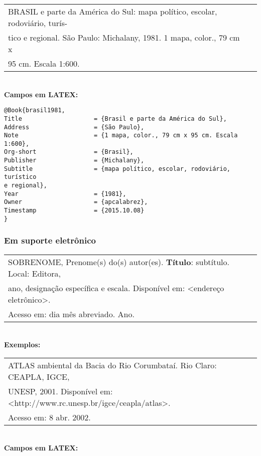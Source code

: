 \begin{tabular}{|l|c|} \hline
BRASIL e parte da América do Sul: mapa político, escolar, rodoviário,
turís-\\ 
tico e regional. São Paulo: Michalany, 1981. 1 mapa, color., 79 cm x\\
95 cm. Escala 1:600. 
	\\\hline
\end{tabular} \\

\textbf{Campos em LATEX:} 

\begin{verbatim}
@Book{brasil1981,
Title                    = {Brasil e parte da América do Sul},
Address                  = {São Paulo},
Note                     = {1 mapa, color., 79 cm x 95 cm. Escala 1:600},
Org-short                = {Brasil},
Publisher                = {Michalany},
Subtitle                 = {mapa político, escolar, rodoviário, turístico 
e regional},
Year                     = {1981},
Owner                    = {apcalabrez},
Timestamp                = {2015.10.08}
}
\end{verbatim}

\subsubsection{Em suporte eletrônico}

\begin{tabular}{|l|c|} \hline
SOBRENOME, Prenome(s) do(s) autor(es). \textbf{Título}: subtítulo. Local: Editora,\\
ano, designação específica e escala. Disponível em: <endereço eletrônico>. \\
Acesso em: dia mês abreviado. Ano. 
	\\\hline
\end{tabular} \\

\textbf{Exemplos:} \\

\begin{tabular}{|l|c|} \hline
ATLAS ambiental da Bacia do Rio Corumbataí. Rio Claro: CEAPLA, IGCE,\\
UNESP, 2001. Disponível em: <http://www.rc.unesp.br/igce/ceapla/atlas>.\\
Acesso em: 8 abr. 2002. 
	\\\hline
\end{tabular} \\

\textbf{Campos em LATEX:} 

